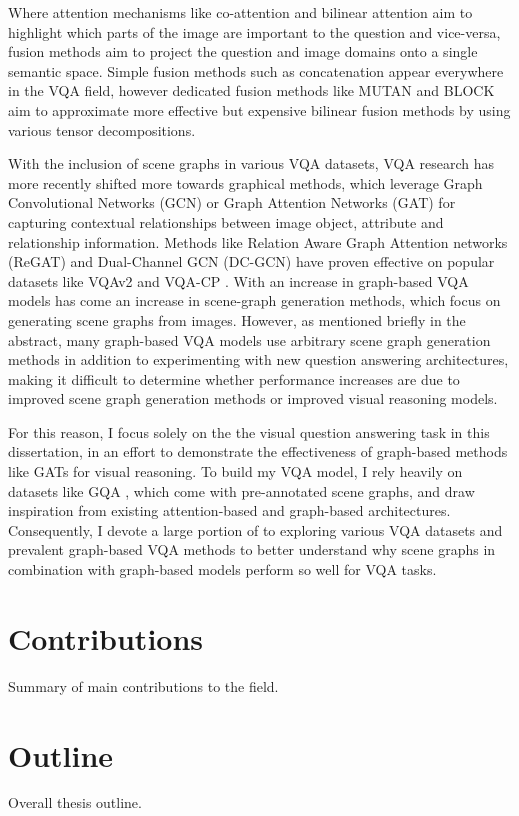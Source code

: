 Where attention mechanisms like co-attention and bilinear attention aim to highlight which parts of the image are important to the question and vice-versa, fusion methods aim to project the question and image domains onto a single semantic space. Simple fusion methods such as concatenation appear everywhere in the VQA field, however dedicated fusion methods like MUTAN \cite{ben2017mutan} and BLOCK \cite{ben2019block} aim to approximate more effective but expensive bilinear fusion methods by using various tensor decompositions.

With the inclusion of scene graphs in various VQA datasets, VQA research has more recently shifted more towards graphical methods, which leverage Graph Convolutional Networks (GCN) \cite{kipf2016semi} or Graph Attention Networks (GAT) \cite{velivckovic2017graph} for capturing contextual relationships between image object, attribute and relationship information. Methods like Relation Aware Graph Attention networks (ReGAT) \cite{li2019relation} and Dual-Channel GCN (DC-GCN) \cite{huang2020aligned} have proven effective on popular datasets like VQAv2 \cite{goyal2017making} and VQA-CP \cite{agrawal2018dont}. With an increase in graph-based VQA models has come an increase in scene-graph generation methods, which focus on generating scene graphs from images. However, as mentioned briefly in the abstract, many graph-based VQA models use arbitrary scene graph generation methods in addition to experimenting with new question answering architectures, making it difficult to determine whether performance increases are due to improved scene graph generation methods or improved visual reasoning models.

For this reason, I focus solely on the the visual question answering task in this dissertation, in an effort to demonstrate the effectiveness of graph-based methods like GATs for visual reasoning. To build my VQA model, I rely heavily on datasets like GQA \cite{hudson2018compositional}, which come with pre-annotated scene graphs, and draw inspiration from existing attention-based and graph-based architectures. Consequently, I devote a large portion of \chapterautorefname{ \ref{chapter:literature}} to exploring various VQA datasets and prevalent graph-based VQA methods to better understand why scene graphs in combination with graph-based models perform so well for VQA tasks.

\section{Contributions}

{\color{red}Summary of main contributions to the field.}

\section{Outline}

{\color{red}Overall thesis outline.}
